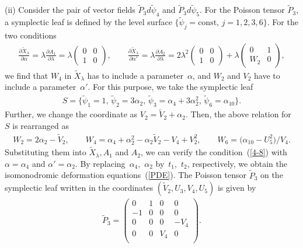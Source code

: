 \documentclass[10pt,a4paper]{amsart}
\numberwithin{equation}{section}
\begin{document}
(ii) Consider the pair of vector f\/ields $\widetilde{P}_3 d\widetilde{\psi}_4$ and $\widetilde{P}_3 d\widetilde{\psi}_5$. For the Poisson tensor $\widetilde{P}_3$, a symplectic leaf is def\/ined by the level surface $\{ \widetilde{\psi}_j = \text{const},\, j=1,2,3,6\}$.
For the two conditions
\begin{gather}
\frac{\partial \widetilde{X}_\lambda }{\partial \alpha } = \lambda \frac{\partial A_1 }{\partial \lambda } = \lambda \left(
\begin{matrix}
0 & 0 \\
1 & 0
\end{matrix}
\right), \qquad
\frac{\partial \widetilde{X}_\lambda }{\partial \alpha' } = \lambda \frac{\partial A_2 }{\partial \lambda } = 2\lambda^2 \left(
\begin{matrix}
0 & 0 \\
1 & 0
\end{matrix}
\right) + \lambda \left(
\begin{matrix}
0 & 1 \\
W_2 & 0
\end{matrix}
\right), \label{4-8}
\end{gather}
we f\/ind that $W_4$ in $\widetilde{X}_\lambda $ has to include a parameter~$\alpha $, and $W_2$ and $V_2$ have to include a parame\-ter~$\alpha' $. For this purpose, we take the symplectic leaf
\begin{gather*}
S = \big\{ \widetilde{\psi}_1 = 1,\, \widetilde{\psi}_2 = 3\alpha _2
 ,\, \widetilde{\psi}_3 = \alpha _4 + 3\alpha _2^2,\,
 \widetilde{\psi}_6 = \alpha _{10}\big \}.
\end{gather*}
Further,  we change the coordinate as $V_2 = \widetilde{V}_2 + \alpha _2$. Then, the above relation for $S$ is rearranged as
\begin{gather*}
W_2 = 2 \alpha _2-\widetilde{V}_2,\qquad W_4 = \alpha _4 + \alpha _2^2 - \alpha _2\widetilde{V}_2 - V_4 + V_2^2,
\qquad W_6 = \big(\alpha _{10}- U_5^2\big)/V_4.
\end{gather*}
Substituting them into $\widetilde{X}_\lambda , A_1$ and $A_2$, we can verify the condition~(\ref{4-8}) with $\alpha = \alpha _4$ and $\alpha ' = \alpha _2$. By replacing~$\alpha _4$,~$\alpha _2$ by~$t_1$,~$t_2$, respectively, we obtain the isomonodromic deformation equations~(\ref{PDE}). The Poisson tensor $\widetilde{P}_3$ on the symplectic leaf written in the coordinates $(\widetilde{V}_2, U_3, V_4, U_5)$ is given by
\begin{gather*}
\widetilde{P}_3 = \left(
\begin{matrix}
0 &1 &0 &0 \\
-1&0 &0 &0 \\
0&0 &0 &-V_4 \\
0&0 &V_4 &0 \\
\end{matrix}
\right).
\end{gather*}
\end{document}
